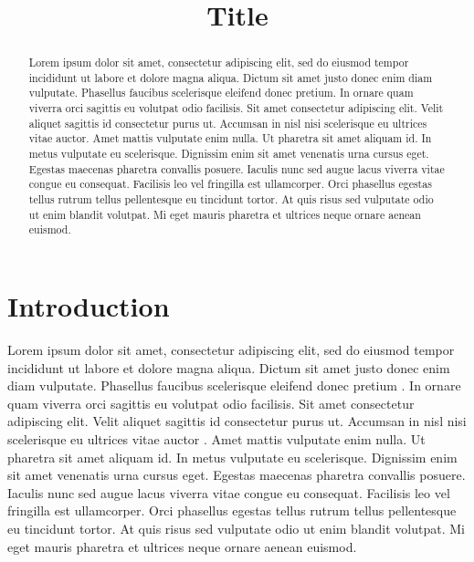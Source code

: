 \documentclass{article}
\title{Title}
\begin{document}
%
\maketitle
%
\begin{abstract}
Lorem ipsum dolor sit amet, consectetur adipiscing elit, sed do eiusmod tempor incididunt ut labore et dolore magna aliqua. Dictum sit amet justo donec enim diam vulputate. Phasellus faucibus scelerisque eleifend donec pretium. In ornare quam viverra orci sagittis eu volutpat odio facilisis. Sit amet consectetur adipiscing elit. Velit aliquet sagittis id consectetur purus ut. Accumsan in nisl nisi scelerisque eu ultrices vitae auctor. Amet mattis vulputate enim nulla. Ut pharetra sit amet aliquam id. In metus vulputate eu scelerisque. Dignissim enim sit amet venenatis urna cursus eget. Egestas maecenas pharetra convallis posuere. Iaculis nunc sed augue lacus viverra vitae congue eu consequat. Facilisis leo vel fringilla est ullamcorper. Orci phasellus egestas tellus rutrum tellus pellentesque eu tincidunt tortor. At quis risus sed vulputate odio ut enim blandit volutpat. Mi eget mauris pharetra et ultrices neque ornare aenean euismod.

%
\begin{keywords}


\end{keywords}
%
\end{abstract}
\section{Introduction}

Lorem ipsum dolor sit amet, consectetur adipiscing elit, sed do eiusmod tempor incididunt ut labore et dolore magna aliqua. Dictum sit amet justo donec enim diam vulputate. Phasellus faucibus scelerisque eleifend donec pretium \cite{xiang2017sar}. In ornare quam viverra orci sagittis eu volutpat odio facilisis. Sit amet consectetur adipiscing elit. Velit aliquet sagittis id consectetur purus ut. Accumsan in nisl nisi scelerisque eu ultrices vitae auctor \cite{qin2018edge}. Amet mattis vulputate enim nulla. Ut pharetra sit amet aliquam id. In metus vulputate eu scelerisque. Dignissim enim sit amet venenatis urna cursus eget. Egestas maecenas pharetra convallis posuere. Iaculis nunc sed augue lacus viverra vitae congue eu consequat. Facilisis leo vel fringilla est ullamcorper. Orci phasellus egestas tellus rutrum tellus pellentesque eu tincidunt tortor. At quis risus sed vulputate odio ut enim blandit volutpat. Mi eget mauris pharetra et ultrices neque ornare aenean euismod.
\end{document}
